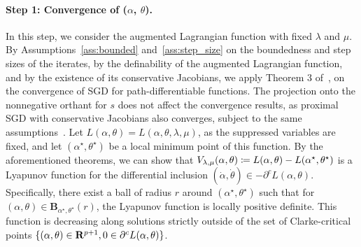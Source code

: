 \paragraph{Step 1: Convergence of ($\alpha$,  $\theta$).}  In this step, we consider the augmented Lagrangian function with fixed $\lambda$ and $\mu$.
By Assumptions~\ref{ass:bounded} and~\ref{ass:step_size} on the boundedness and step sizes of the iterates, by the definability of the augmented Lagrangian function, and by the existence of its conservative Jacobians, we apply Theorem 3 of~\cite{path-diff}, on the convergence of SGD for path-differentiable functions.
The projection onto the nonnegative orthant for $s$ does not affect the convergence results, as proximal SGD with conservative Jacobians also converges, subject to the same assumptions~\citep[Theorem 6.2]{Davis}.
Let $L(\alpha,\theta) = L(\alpha,\theta,\lambda,\mu)$, as the suppressed variables are fixed, and let $(\alpha^\star,\theta^\star)$ be a 
local 
minimum point of this function.
By the aforementioned theorems, we can show
that 
$V_{\lambda,\mu}(\alpha,\theta) \coloneqq L(\alpha,\theta) - L(\alpha^\star,\theta^\star)$ is a Lyapunov function for the differential inclusion $(\dot{\alpha},\dot{\theta}) \in -\partial^cL(\alpha,\theta)$. 
Specifically, there exist a ball of radius $r$ around $(\alpha^\star,\theta^\star)$ such that for $(\alpha,\theta) \in \mathbf{B}_{\alpha^\star,\theta^\star}(r)$, the Lyapunov function is locally positive definite. 
This function is decreasing along solutions strictly outside of the set of Clarke-critical points $\{(\alpha,\theta) \in {\mathbf R}^{p+1}, 0 \in \partial^c L(\alpha,\theta)\}$.
